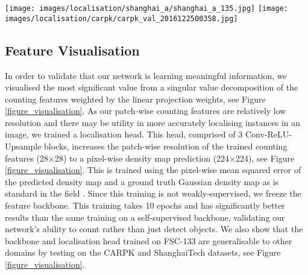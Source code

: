 \documentclass[letterpaper, 11pt]{IEEEtran}
\begin{document}
\begin{figure*}
\texttt{[image: images/localisation/shanghai\_a/shanghai\_a\_135.jpg]}
\texttt{[image: images/localisation/carpk/carpk\_val\_2016122500358.jpg]}     \caption{\textbf{Localisation of latent counting features.} Columns 1-4: patch-wise principal components of the counting backbone features, Columns 5-8, 9, 10: pixel-wise localisation predictions of unseen dataset classes from FSC-133, CARPK and ShanghaiTech respectively. The latent counting feature density maps are generated by a localisation head trained on FSC-133.
The count and prediction of each image are in the top left and the top right respectively.  Best viewed in colour and by zooming in.
    }
    \label{figure_visualisation}
\end{figure*}
\subsection{Feature Visualisation}
\label{results_visualisation}
In order to validate that our network is learning meaningful information, we visualised the most significant value from a singular value decomposition of the counting features weighted by the linear projection weights, see Figure \ref{figure_visualisation}.
As our patch-wise counting features are relatively low resolution and there may be utility in more accurately localising instances in an image, we trained a localisation head. This head, comprised of 3 Conv-ReLU-Upsample blocks, increases the  patch-wise resolution of the trained counting features (28$\times$28) to a  pixel-wise density map prediction (224$\times$224), see Figure \ref{figure_visualisation}. This is trained using the pixel-wise mean squared error of the predicted density map and a ground truth Gaussian density map as is standard in the field \cite{ranjan2021Famnet}. Since this training is not weakly-supervised, we freeze the feature backbone. This training takes 10 epochs and has significantly better results than the same training on a self-supervised backbone, validating our network's ability to count rather than just detect objects. We also show that the backbone and localisation head trained on FSC-133 are generalisable to other domains by testing on the CARPK and ShanghaiTech \cite{zhang2016single} datasets, see Figure \ref{figure_visualisation}.
\end{document}
